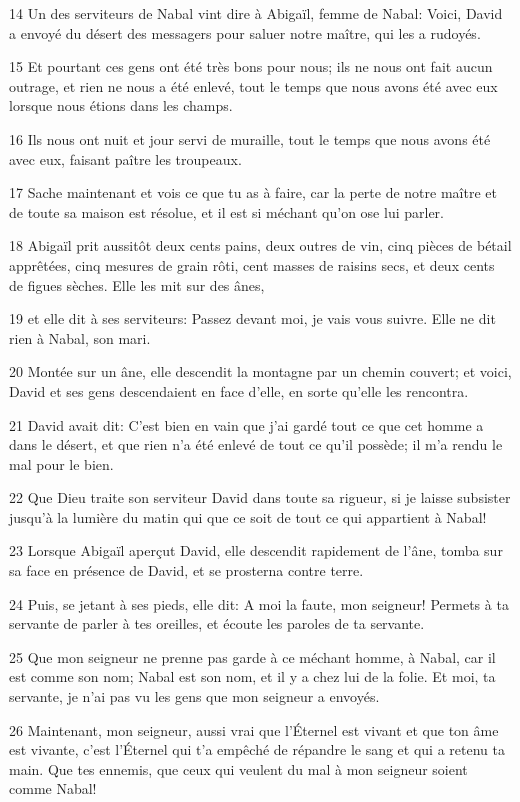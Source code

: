 \par 14 Un des serviteurs de Nabal vint dire à Abigaïl, femme de Nabal: Voici, David a envoyé du désert des messagers pour saluer notre maître, qui les a rudoyés.
\par 15 Et pourtant ces gens ont été très bons pour nous; ils ne nous ont fait aucun outrage, et rien ne nous a été enlevé, tout le temps que nous avons été avec eux lorsque nous étions dans les champs.
\par 16 Ils nous ont nuit et jour servi de muraille, tout le temps que nous avons été avec eux, faisant paître les troupeaux.
\par 17 Sache maintenant et vois ce que tu as à faire, car la perte de notre maître et de toute sa maison est résolue, et il est si méchant qu'on ose lui parler.
\par 18 Abigaïl prit aussitôt deux cents pains, deux outres de vin, cinq pièces de bétail apprêtées, cinq mesures de grain rôti, cent masses de raisins secs, et deux cents de figues sèches. Elle les mit sur des ânes,
\par 19 et elle dit à ses serviteurs: Passez devant moi, je vais vous suivre. Elle ne dit rien à Nabal, son mari.
\par 20 Montée sur un âne, elle descendit la montagne par un chemin couvert; et voici, David et ses gens descendaient en face d'elle, en sorte qu'elle les rencontra.
\par 21 David avait dit: C'est bien en vain que j'ai gardé tout ce que cet homme a dans le désert, et que rien n'a été enlevé de tout ce qu'il possède; il m'a rendu le mal pour le bien.
\par 22 Que Dieu traite son serviteur David dans toute sa rigueur, si je laisse subsister jusqu'à la lumière du matin qui que ce soit de tout ce qui appartient à Nabal!
\par 23 Lorsque Abigaïl aperçut David, elle descendit rapidement de l'âne, tomba sur sa face en présence de David, et se prosterna contre terre.
\par 24 Puis, se jetant à ses pieds, elle dit: A moi la faute, mon seigneur! Permets à ta servante de parler à tes oreilles, et écoute les paroles de ta servante.
\par 25 Que mon seigneur ne prenne pas garde à ce méchant homme, à Nabal, car il est comme son nom; Nabal est son nom, et il y a chez lui de la folie. Et moi, ta servante, je n'ai pas vu les gens que mon seigneur a envoyés.
\par 26 Maintenant, mon seigneur, aussi vrai que l'Éternel est vivant et que ton âme est vivante, c'est l'Éternel qui t'a empêché de répandre le sang et qui a retenu ta main. Que tes ennemis, que ceux qui veulent du mal à mon seigneur soient comme Nabal!
